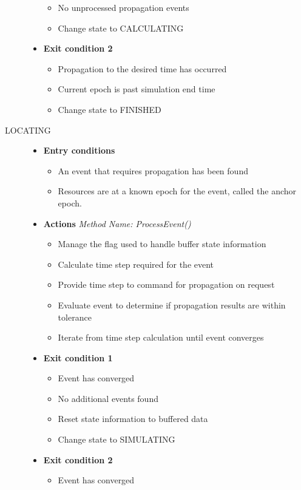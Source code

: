\begin{description}
\begin{itemize}
\begin{itemize}
\item No unprocessed propagation events
\item Change state to CALCULATING
\end{itemize}
\item \textbf{Exit condition 2}
\begin{itemize}
\item Propagation to the desired time has occurred
\item Current epoch is past simulation end time
\item Change state to FINISHED
\end{itemize}
\end{itemize}
\item [LOCATING]\hspace{1pt}
\begin{itemize}
\item \textbf{Entry conditions}
\begin{itemize}
\item An event that requires propagation has been found
\item Resources are at a known epoch for the event, called the anchor epoch.
\end{itemize}
\item \textbf{Actions} \textit{Method Name:  ProcessEvent()}
\begin{itemize}
\item Manage the flag used to handle buffer state information
\item Calculate time step required for the event
\item Provide time step to command for propagation on request
\item Evaluate event to determine if propagation results are within tolerance
\item Iterate from time step calculation until event converges
\end{itemize}
\item \textbf{Exit condition 1}
\begin{itemize}
\item Event has converged
\item No additional events found
\item Reset state information to buffered data
\item Change state to SIMULATING
\end{itemize}
\item \textbf{Exit condition 2}
\begin{itemize}
\item Event has converged

\end{itemize}
\end{itemize}
\end{description}
